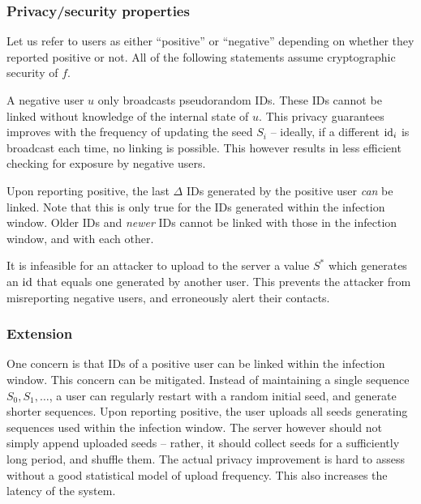 \documentclass{article}
\begin{document}
\subsubsection{Privacy/security properties}

Let us refer to users as either ``positive'' or ``negative'' depending on whether they reported positive or not. All of the following statements assume cryptographic security of $f$.

  A negative user $u$ only broadcasts pseudorandom IDs. These IDs cannot be linked without knowledge of the internal state of $u$. This privacy guarantees improves with the frequency of updating the seed $S_i$ -- ideally, if a different $\mathrm{id}_i$ is broadcast each time, no linking is possible. This however results in less efficient checking for exposure by negative users.
\medskip

 Upon reporting positive, the last $\Delta$ IDs generated by the positive user {\em can} be linked. Note that this is only true for the IDs generated within the infection window. Older IDs and {\em newer} IDs cannot be linked with those in the infection window, and with each other.
\medskip

 It is infeasible for an attacker to upload to the server a value $S^*$ which generates an $\mathrm{id}$ that equals one generated by another user. This prevents the attacker from misreporting negative users, and erroneously alert their contacts.  

\subsubsection{Extension}

One concern is that IDs of a positive user can be linked within the infection window. This concern can be mitigated. Instead of maintaining a single sequence $S_0, S_1, \ldots$, a user can regularly restart with a random initial seed, and generate  shorter sequences. Upon reporting positive, the user uploads all seeds generating sequences used within the infection window. The server however should not simply append uploaded seeds -- rather, it should collect seeds for a sufficiently long period, and shuffle them. The actual privacy improvement is  hard to assess without a good statistical model of upload frequency. This also increases the latency of the system.
\end{document}
